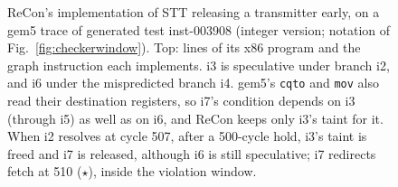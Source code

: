 \begin{figure}[t]
{\begin{tikzpicture}
\end{tikzpicture}%
}%
\caption{ReCon's implementation of STT releasing a transmitter early, on a gem5 trace of generated test inst-003908 (integer version; notation of Fig.~\ref{fig:checkerwindow}). Top: lines of its x86 program and the graph instruction each implements. i3 is speculative under branch i2, and i6 under the mispredicted branch i4. gem5's \texttt{cqto} and \texttt{mov} also read their destination registers, so i7's condition depends on i3 (through i5) as well as on i6, and ReCon keeps only i3's taint for it. When i2 resolves at cycle 507, after a 500-cycle hold, i3's taint is freed and i7 is released, although i6 is still speculative; i7 redirects fetch at 510 ($\star$), inside the violation window.}
\label{fig:otb}
\end{figure}
